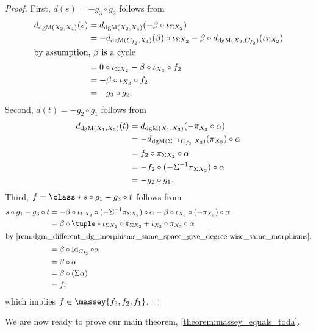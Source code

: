\begin{proof}
    First, \( d(s) = -g_3 \circ g_2 \) follows from
    \begin{align*}
        d_{\operatorname{dgM}(X_2, X_4)}(s) &= d_{\operatorname{dgM}(X_2, X_4)}(- \beta \circ \iota_{\Sigma X_2}) \\
        &= - d_{\operatorname{dgM}(C_{f_2}, X_4)}(\beta) \circ \iota_{\Sigma X_2} - \beta \circ d_{\operatorname{dgM}(X_2, C_{f_2})}(\iota_{\Sigma X_2}) \\
        \intertext{by assumption, \( \beta \) is a cycle}
        &= 0 \circ \iota_{\Sigma X_2} - \beta \circ \iota_{X_3} \circ f_2 \\
        &= - \beta \circ \iota_{X_3} \circ f_2 \\
        &= - g_3 \circ g_2.
    \end{align*}
    Second, \( d(t) = - g_2 \circ g_1 \) follows from
    \begin{align*}
         d_{\operatorname{dgM}(X_1, X_3)}(t) &= d_{\operatorname{dgM}(X_1, X_3)}(- \pi_{X_3} \circ \alpha) \\
         &= -d_{\operatorname{dgM}(\Sigma^{-1} C_{f_2}, X_3)}(\pi_{X_3}) \circ \alpha \\
         &= f_2 \circ \pi_{\Sigma X_2} \circ \alpha \\
         &= - f_2 \circ (- \Sigma^{-1} \pi_{\Sigma X_2}) \circ \alpha \\
         &= - g_2 \circ g_1.
    \end{align*}
    Third, \( f = \class*{s \circ g_1 - g_3 \circ t} \) follows from
    \begin{align*}
        s \circ g_1 - g_3 \circ t &= - \beta \circ \iota_{\Sigma X_2} \circ (-\Sigma^{-1} \pi_{\Sigma X_2}) \circ \alpha - \beta \circ \iota_{X_3} \circ (- \pi_{X_3}) \circ \alpha \\
        &= \beta \circ \tuple*{\iota_{\Sigma X_2} \circ \pi_{\Sigma X_2} + \iota_{X_3} \circ \pi_{X_3}} \circ \alpha \\
        \intertext{by \autoref{rem:dgm_different_dg_morphisms_same_space_give_degree-wise_same_morphisms},}
        &= \beta \circ \Id_{C_{f_2}} \circ \alpha \\
        &= \beta \circ \alpha \\
        &= \beta \circ (\Sigma \alpha) \\
        &= f,
    \end{align*}
    which implies \( f \in \massey{f_3, f_2, f_1} \).
\end{proof}

We are now ready to prove our main theorem, \autoref{theorem:massey_equals_toda}.

